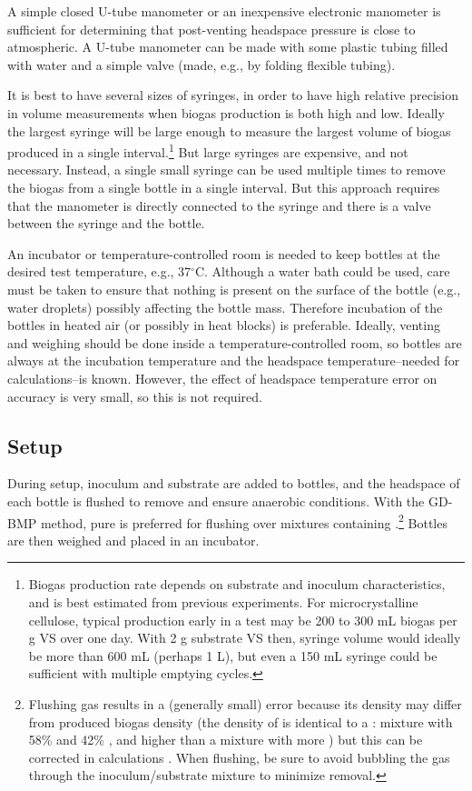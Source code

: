 \documentclass[]{article}
\begin{document}
A simple closed U-tube manometer or an inexpensive electronic manometer is sufficient for determining that post-venting headspace pressure is close to atmospheric.
A U-tube manometer can be made with some plastic tubing filled with water and a simple valve (made, e.g., by folding flexible tubing).

It is best to have several sizes of syringes, in order to have high relative precision in volume measurements when biogas production is both high and low.
Ideally the largest syringe will be large enough to measure the largest volume of biogas produced in a single interval.\footnote{
  Biogas production rate depends on substrate and inoculum characteristics, and is best estimated from previous experiments.
  For microcrystalline cellulose, typical production early in a test may be 200 to 300 mL biogas per g VS over one day. 
  With 2 g substrate VS then, syringe volume would ideally be more than 600 mL (perhaps 1 L), but even a 150 mL syringe could be sufficient with multiple emptying cycles.
}
But large syringes are expensive, and not necessary.
Instead, a single small syringe can be used multiple times to remove the biogas from a single bottle in a single interval.
But this approach requires that the manometer is directly connected to the syringe and there is a valve between the syringe and the bottle.

An incubator or temperature-controlled room is needed to keep bottles at the desired test temperature, e.g., 37$^\circ$C.
Although a water bath could be used, care must be taken to ensure that nothing is present on the surface of the bottle (e.g., water droplets) possibly affecting the bottle mass.
Therefore incubation of the bottles in heated air (or possibly in heat blocks) is preferable.
Ideally, venting and weighing should be done inside a temperature-controlled room, so bottles are always at the incubation temperature and the headspace temperature--needed for calculations--is known.  
However, the effect of headspace temperature error on accuracy is very small, so this is not required.

\subsection{Setup}
During setup, inoculum and substrate are added to bottles, and the headspace of each bottle is flushed to remove  and ensure anaerobic conditions. 
With the GD-BMP method, pure  is preferred for flushing over mixtures containing .\footnote{
  Flushing gas results in a (generally small) error because its density may differ from produced biogas density (the density of  is identical to a : mixture with 58\%  and 42\% , and higher than a mixture with more ) but this can be corrected in calculations \citep{justesenDevelopmentValidationLowcost2019}. 
When flushing, be sure to avoid bubbling the gas through the inoculum/substrate mixture to minimize  removal.
}
Bottles are then weighed and placed in an incubator.
\end{document}
